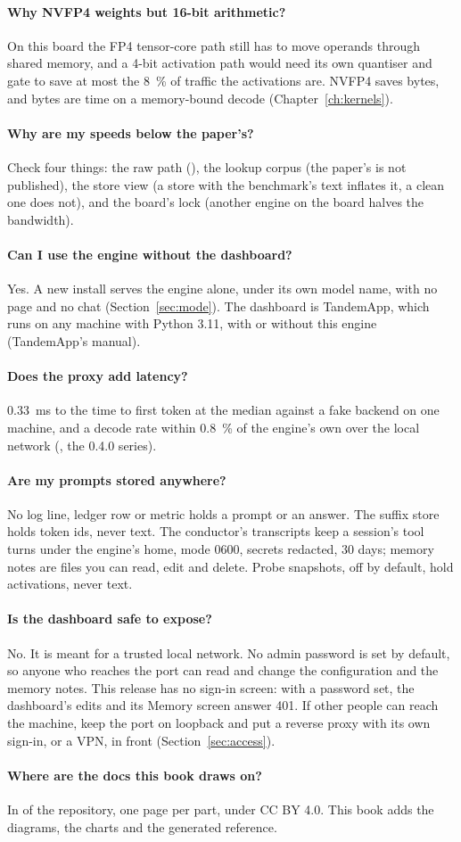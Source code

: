 \paragraph{Why NVFP4 weights but 16-bit arithmetic?} On this board the FP4 tensor-core path still has to move operands through shared memory, and a 4-bit activation path would need its own quantiser and gate to save at most the 8~\% of traffic the activations are. NVFP4 saves bytes, and bytes are time on a memory-bound decode (Chapter~\ref{ch:kernels}).

\paragraph{Why are my speeds below the paper's?} Check four things: the raw path (), the lookup corpus (the paper's is not published), the store view (a store with the benchmark's text inflates it, a clean one does not), and the board's lock (another engine on the board halves the bandwidth).

\paragraph{Can I use the engine without the dashboard?} Yes. A new install serves the engine alone, under its own model name, with no page and no chat (Section~\ref{sec:mode}). The dashboard is TandemApp, which runs on any machine with Python 3.11, with or without this engine (TandemApp's manual).

\paragraph{Does the proxy add latency?} 0.33~ms to the time to first token at the median against a fake backend on one machine, and a decode rate within 0.8~\% of the engine's own over the local network (\measured, the 0.4.0 series).

\paragraph{Are my prompts stored anywhere?} No log line, ledger row or metric holds a prompt or an answer. The suffix store holds token ids, never text. The conductor's transcripts keep a session's tool turns under the engine's home, mode 0600, secrets redacted, 30 days; memory notes are files you can read, edit and delete. Probe snapshots, off by default, hold activations, never text.

\paragraph{Is the dashboard safe to expose?} No. It is meant for a trusted local network. No admin password is set by default, so anyone who reaches the port can read and change the configuration and the memory notes. This release has no sign-in screen: with a password set, the dashboard's edits and its Memory screen answer 401. If other people can reach the machine, keep the port on loopback and put a reverse proxy with its own sign-in, or a VPN, in front (Section~\ref{sec:access}).

\paragraph{Where are the docs this book draws on?} In  of the repository, one page per part, under CC BY 4.0. This book adds the diagrams, the charts and the generated reference.
